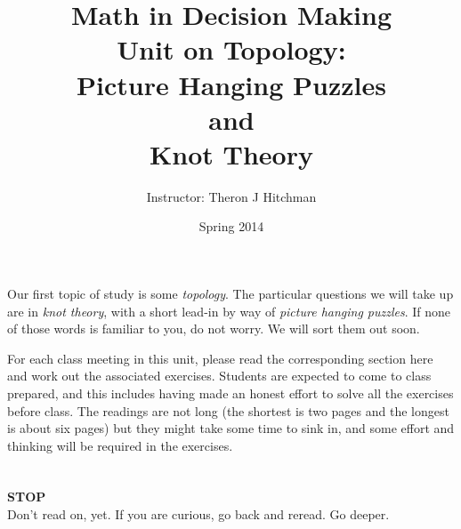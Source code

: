 \documentclass[12pt]{article}
\begin{document}
\title{Math in Decision Making\\ Unit on Topology:\\ 
Picture Hanging Puzzles\\ and\\ Knot Theory}
\author{Instructor: Theron J Hitchman}
\date{Spring 2014}

\maketitle

Our first topic of study is some \emph{topology}. The particular questions we will take up are in \emph{knot theory}, with a short lead-in by way of \emph{picture hanging puzzles}. If none of those words is familiar to you, do not worry. We will sort them out soon.

For each class meeting in this unit, please read the corresponding section here and work out the associated exercises. Students are expected to come to class prepared, and this includes having made an honest effort to solve all the exercises before class. The readings are not long (the shortest is two pages and the longest is about six pages) but they might take some time to sink in, and some effort and thinking will be required in the exercises.

\newpage
$\phantom{Theron J Hitchman}$
\newpage


{\Huge \textbf{STOP}}\\[1in]

Don't read on, yet. If you are curious, go back and reread. Go deeper.
\newpage
$\phantom{Theron J Hitchman}$

\newpage
$\phantom{Theron J Hitchman}$
\newpage

\newpage
$\phantom{Theron J Hitchman}$
\newpage



\newpage
$\phantom{Theron J Hitchman}$
\newpage

\newpage
$\phantom{Theron J Hitchman}$
\newpage

\newpage
$\phantom{Theron J Hitchman}$
\newpage



\end{document}
